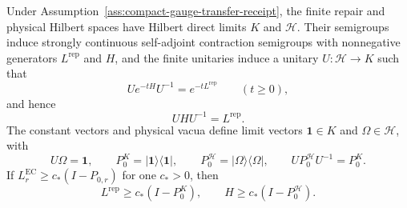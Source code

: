 \begin{theorem}
\label{thm:continuum-transfer-identification}
Under Assumption~\ref{ass:compact-gauge-transfer-receipt}, the finite repair and physical Hilbert
spaces have Hilbert direct limits \(K\) and \(\mathcal H\). Their semigroups induce strongly
continuous self-adjoint contraction semigroups with nonnegative generators
\(L^{\mathrm{rep}}\) and \(H\), and the finite unitaries induce a unitary
\(U:\mathcal H\to K\) such that
\[
U e^{-tH}U^{-1}=e^{-tL^{\mathrm{rep}}}\qquad(t\ge 0),
\]
and hence
\[
UHU^{-1}=L^{\mathrm{rep}}.
\]
The constant vectors and physical vacua define limit vectors
\(\mathbf 1\in K\) and \(\Omega\in\mathcal H\), with
\[
U\Omega=\mathbf 1,
\qquad
P_0^K=|\mathbf 1\rangle\langle\mathbf 1|,
\qquad
P_0^{\mathcal H}=|\Omega\rangle\langle\Omega|,
\qquad
UP_0^{\mathcal H}U^{-1}=P_0^K.
\]
If \(L_r^{\mathrm{EC}}\ge c_*(I-P_{0,r})\) for one \(c_*>0\), then
\[
L^{\mathrm{rep}}\ge c_*(I-P_0^K),
\qquad
H\ge c_*(I-P_0^{\mathcal H}).
\]
\end{theorem}

